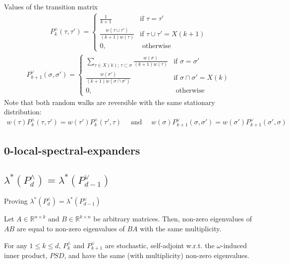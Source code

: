 \documentclass[10pt]{beamer}
\begin{document}
\begin{frame}{Values of the transition matrix}
    \small\begin{align*}
        P_k^{\wedge}(\tau, \tau') = 
        \begin{cases}
            \frac{1}{k+1} & \text{if }  \tau = \tau'  \\
            \frac{w(\tau \cup \tau')}{(k+1)w(\tau)} &  \text{if } \tau \cup \tau'  = X(k+1) \\
            0,  &  \text{ otherwise}
        \end{cases} 
    \end{align*}
    \begin{align*}
        P_{k+1}^{\vee}(\sigma, \sigma') = 
        \begin{cases}
            \sum_{\tau \in X(k);  \hspace{2pt} \tau \subset \sigma} \frac{w(\sigma)}{(k+1)w(\tau)} & \text{if }  \sigma = \sigma'  \\
                    \frac{w(\sigma')}{(k+1)w(\sigma \cap \sigma')} &  \text{if } \sigma \cap \sigma'  = X(k) \\
            0,  &  \text{ otherwise}
        \end{cases} 
    \end{align*}
    Note that both random walks are reversible with the same stationary distribution: \begin{align*}
        w(\tau)P^\wedge_k(\tau, \tau') = w(\tau')P^\wedge_k(\tau', \tau) \quad \text{ and } \quad w(\sigma)P^\vee_{k+1}(\sigma, \sigma') = w(\sigma')P^\vee_{k+1}(\sigma', \sigma)
    \end{align*}
\end{frame}

\subsection{0-local-spectral-expanders}

\subsection{$\lambda^*(P_d^{\wedge})  = \lambda^*(P_{d-1}^{\vee})$}
\begin{frame}{Proving $\lambda^*(P_d^{\wedge})  = \lambda^*(P_{d-1}^{\vee})$}
\begin{fact}[Useful]
    \vspace{2pt}
    Let \( A \in \mathbb{R}^{n \times k} \) and \( B \in \mathbb{R}^{k \times n} \) be arbitrary matrices. Then, non-zero eigenvalues of \( AB \) are equal to non-zero eigenvalues of \( BA \) with the same multiplicity.
\end{fact}

\begin{lemma}[3.1]
    \vspace{2pt}
    For any $1 \leq k \leq d$, $P^{\wedge}_k$ and $P_{k+1}^{\vee}$ are stochastic, self-adjoint w.r.t. the $\omega$-induced inner product, $PSD$, and have the same (with multiplicity) non-zero eigenvalues.
\end{lemma}
\end{frame}
\end{document}
